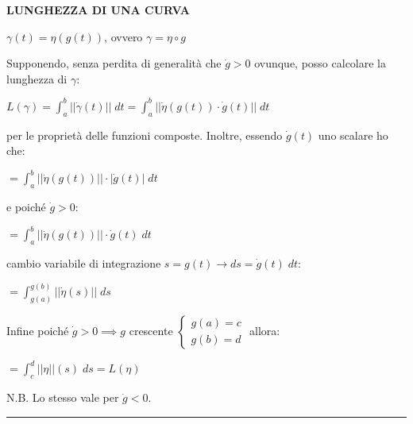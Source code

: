 \documentclass[8pt]{extarticle}
\newenvironment{formulario}
{
\setlength{\columnsep}{3em}
\twocolumn
\lstset{tabsize=3}
\begin{spacing}{1}
\begin{flushleft}
}{
\end{flushleft}
\end{spacing}
}
\newenvironment{tcenter}{
  \par
  \centering
  \setlength{\parskip}{0pt} %
  \noindent
}{
  \par
}
\newenvironment{Descr}
{
	\begin{description}[topsep=0pt,itemsep=0pt,partopsep=0pt, parsep=0pt]
}{
	\end{description}
}
\newenvironment{myParagraph}[1]
{
\begin{tcenter}
\textbf{#1}
\end{tcenter}
}{
\myRule
}
\newcommand{\norma}[1]{\lvert\lvert #1\rvert\rvert}
\newcommand{\modulo}[1]{\lvert #1\rvert}
\newcommand{\myRule}{\rule{250pt}{0.1pt}}
\begin{document}
\begin{formulario}
\begin{myParagraph}{LUNGHEZZA DI UNA CURVA}
\begin{Descr}
\begin{Descr}
					\begin{tcenter}
						$\gamma(t)=\eta(g(t))$, ovvero $\gamma=\eta\circ g$
					\end{tcenter}
					Supponendo, senza perdita di generalità che $\dot{g}>0$ ovunque, posso calcolare la lunghezza di $\gamma$:\\
					\begin{tcenter}
						$L(\gamma)=\int_a^b \norma{\dot{\gamma}(t)}\; dt = \int_a^b \norma{\dot{\eta}(g(t))\cdot \dot{g}(t)}\; dt$
					\end{tcenter}
					per le proprietà delle funzioni composte. Inoltre, essendo $\dot{g}(t)$ uno scalare ho che:
					\begin{tcenter}
						$=\int_a^b \norma{\dot{\eta}(g(t))}\cdot\modulo{\dot{g}(t)} \; dt$
					\end{tcenter}
					e poiché $\dot{g}>0$:
					\begin{tcenter}
						$=\int_a^b \norma{\dot{\eta}(g(t))}\cdot\dot{g}(t) \; dt$
					\end{tcenter}
					cambio variabile di integrazione $s=g(t) \to ds=\dot{g}(t)\; dt$:
					\begin{tcenter}
						$=\int_{g(a)}^{g(b)} \norma{\dot{\eta}(s)}\; ds$
					\end{tcenter}
					Infine poiché $\dot{g}>0 \implies g$ crescente 
					$\begin{cases}
						g(a)=c\\
						g(b)=d
					\end{cases}$
					allora:
					\begin{tcenter}
						$=\int_c^d \norma{\eta}(s)\; ds=L(\eta)$
					\end{tcenter}
					\begin{Descr} 
						\item[N.B.] Lo stesso vale per $\dot{g}<0$. 
					\end{Descr}
				\end{Descr}
			\end{Descr}	
 		\end{myParagraph}
		

	
	
	
	\end{formulario}
\end{document}
